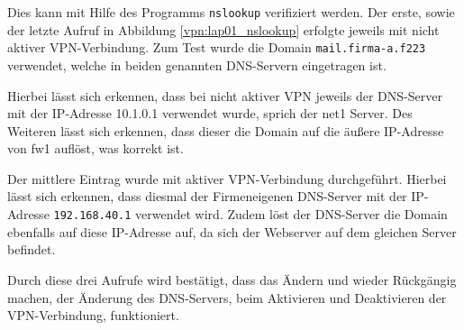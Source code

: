 Dies kann mit Hilfe des Programms \texttt{nslookup} verifiziert werden. Der erste, sowie der letzte Aufruf in Abbildung \ref{vpn:lap01_nslookup} erfolgte jeweils mit nicht aktiver VPN-Verbindung. Zum Test wurde die Domain \texttt{mail.firma-a.f223} verwendet, welche in beiden genannten DNS-Servern eingetragen ist.

Hierbei lässt sich erkennen, dass bei nicht aktiver VPN jeweils der DNS-Server mit der IP-Adresse 10.1.0.1 verwendet wurde, sprich der net1 Server. Des Weiteren lässt sich erkennen, dass dieser die Domain auf die äußere IP-Adresse von fw1 auflöst, was korrekt ist.

Der mittlere Eintrag wurde mit aktiver VPN-Verbindung durchgeführt. Hierbei lässt sich erkennen, dass diesmal der Firmeneigenen DNS-Server mit der IP-Adresse \texttt{192.168.40.1} verwendet wird. Zudem löst der DNS-Server die Domain ebenfalls auf diese IP-Adresse auf, da sich der Webserver auf dem gleichen Server befindet.

Durch diese drei Aufrufe wird bestätigt, dass das Ändern und wieder Rückgängig machen, der Änderung des DNS-Servers, beim Aktivieren und Deaktivieren der VPN-Verbindung, funktioniert.
